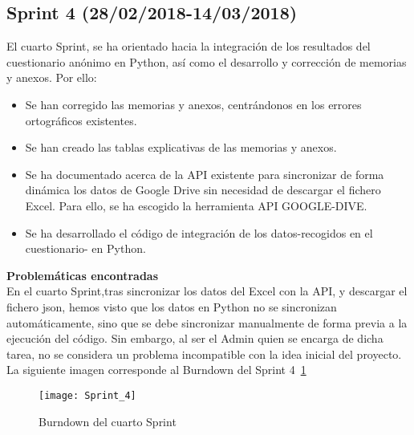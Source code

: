 \subsection{\textbf{Sprint 4} (28/02/2018-14/03/2018) }
El cuarto  Sprint, se ha orientado hacia la integración de los resultados del cuestionario anónimo en Python, así como el desarrollo y corrección de memorias y anexos. 
Por ello: 
\begin{itemize}
\item Se han corregido las memorias y anexos, centrándonos en los errores ortográficos existentes.  
\item Se han creado las tablas explicativas de las memorias y anexos. 
\item Se ha documentado acerca de la API existente para sincronizar de forma dinámica los datos de Google Drive sin necesidad de descargar el fichero Excel. Para ello, se ha escogido la herramienta API GOOGLE-DIVE. 
\item Se ha desarrollado el código de integración de los datos-recogidos en el cuestionario- en Python.   
\end{itemize}
\textbf{Problemáticas encontradas}\\En el cuarto Sprint,tras sincronizar los datos del Excel con la API, y descargar el fichero json, hemos visto que los datos en Python no se sincronizan automáticamente, sino que se debe sincronizar manualmente de forma previa a la ejecución del código. Sin embargo, al ser el Admin quien se encarga de dicha tarea, no se considera un problema incompatible con la idea inicial del proyecto.  
 \\La siguiente imagen corresponde al Burndown del Sprint 4~\ref{fig:A.2.4}
\begin{figure}[h]
\centering
\texttt{[image: Sprint\_4]}
\caption{Burndown del cuarto Sprint}
\label{fig:A.2.4}
\end{figure}
\\


